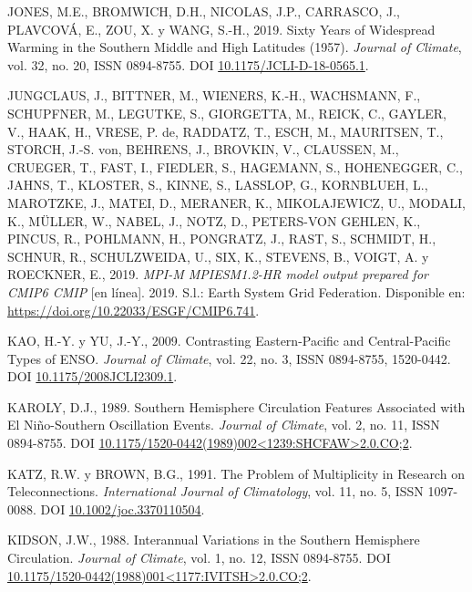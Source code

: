 \documentclass[12pt,oneside,a4paper]{reedthesis}
\newlength{\cslhangindent}
\newenvironment{CSLReferences}[2] %
 {%
  \setlength{\parindent}{0pt}
  \ifodd #1 \everypar{\setlength{\hangindent}{\cslhangindent}}\ignorespaces\fi
  \ifnum #2 > 0
  \setlength{\parskip}{#2\baselineskip}
  \fi
 }%
 {}
\begin{document}
\begin{CSLReferences}{1}{0}
\leavevmode{}%
JONES, M.E., BROMWICH, D.H., NICOLAS, J.P., CARRASCO, J., PLAVCOVÁ, E., ZOU, X. y WANG, S.-H., 2019. Sixty {Years} of {Widespread Warming} in the {Southern Middle} and {High Latitudes} (1957). \emph{Journal of Climate}, vol. 32, no. 20, ISSN 0894-8755. DOI \href{https://doi.org/10.1175/JCLI-D-18-0565.1}{10.1175/JCLI-D-18-0565.1}.

\leavevmode{}%
JUNGCLAUS, J., BITTNER, M., WIENERS, K.-H., WACHSMANN, F., SCHUPFNER, M., LEGUTKE, S., GIORGETTA, M., REICK, C., GAYLER, V., HAAK, H., VRESE, P. de, RADDATZ, T., ESCH, M., MAURITSEN, T., STORCH, J.-S. von, BEHRENS, J., BROVKIN, V., CLAUSSEN, M., CRUEGER, T., FAST, I., FIEDLER, S., HAGEMANN, S., HOHENEGGER, C., JAHNS, T., KLOSTER, S., KINNE, S., LASSLOP, G., KORNBLUEH, L., MAROTZKE, J., MATEI, D., MERANER, K., MIKOLAJEWICZ, U., MODALI, K., MÜLLER, W., NABEL, J., NOTZ, D., PETERS-VON GEHLEN, K., PINCUS, R., POHLMANN, H., PONGRATZ, J., RAST, S., SCHMIDT, H., SCHNUR, R., SCHULZWEIDA, U., SIX, K., STEVENS, B., VOIGT, A. y ROECKNER, E., 2019. \emph{MPI-M MPIESM1.2-HR model output prepared for CMIP6 CMIP} {[}en línea{]}. 2019. S.l.: Earth System Grid Federation. Disponible en: \url{https://doi.org/10.22033/ESGF/CMIP6.741}.

\leavevmode{}%
KAO, H.-Y. y YU, J.-Y., 2009. Contrasting {Eastern-Pacific} and {Central-Pacific Types} of {ENSO}. \emph{Journal of Climate}, vol. 22, no. 3, ISSN 0894-8755, 1520-0442. DOI \href{https://doi.org/10.1175/2008JCLI2309.1}{10.1175/2008JCLI2309.1}.

\leavevmode{}%
KAROLY, D.J., 1989. Southern {Hemisphere Circulation Features Associated} with {El Niño-Southern Oscillation Events}. \emph{Journal of Climate}, vol. 2, no. 11, ISSN 0894-8755. DOI \href{https://doi.org/10.1175/1520-0442(1989)002\%3C1239:SHCFAW\%3E2.0.CO;2}{10.1175/1520-0442(1989)002\textless1239:SHCFAW\textgreater2.0.CO;2}.

\leavevmode{}%
KATZ, R.W. y BROWN, B.G., 1991. The Problem of Multiplicity in Research on Teleconnections. \emph{International Journal of Climatology}, vol. 11, no. 5, ISSN 1097-0088. DOI \href{https://doi.org/10.1002/joc.3370110504}{10.1002/joc.3370110504}.

\leavevmode{}%
KIDSON, J.W., 1988. Interannual {Variations} in the {Southern Hemisphere Circulation}. \emph{Journal of Climate}, vol. 1, no. 12, ISSN 0894-8755. DOI \href{https://doi.org/10.1175/1520-0442(1988)001\%3C1177:IVITSH\%3E2.0.CO;2}{10.1175/1520-0442(1988)001\textless1177:IVITSH\textgreater2.0.CO;2}.


\end{CSLReferences}
\end{document}
